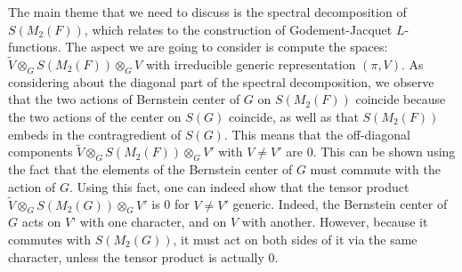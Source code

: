 \documentclass[12pt,a4paper,english]{article}
\theoremstyle{plain}
\theoremstyle{definition}
\begin{document}
The main theme that we need to discuss is the spectral decomposition of $S(M_{2}(F))$, which relates to the construction of Godement-Jacquet $L$-functions. The aspect we are going to consider is compute the spaces: $\tilde{V}\otimes_{G}S(M_{2}(F))\otimes_{G}V$ with irreducible generic representation $(\pi, V)$. As considering about the diagonal part of the spectral decomposition, we observe that the two actions of Bernstein center of $G$ on $S(M_{2}(F))$ coincide because the two actions of the center on $S(G)$ coincide, as well as that $S(M_{2}(F))$ embeds in the contragredient of $S(G)$. This means that the off-diagonal components $\widetilde{V}\otimes_{G}S(M_{2}(F))\otimes_{G}V'$ with $V\not=V'$ are 0. 
This can be shown using the fact that the elements of the Bernstein center of $G$ must commute with the action of $G$. Using this fact, one can indeed show that the tensor product $\widetilde{V} \otimes_G S(M_2(G)) \otimes_G V'$ is 0 for $V\neq V'$ generic. Indeed, the Bernstein center of $G$ acts on $V’$ with one character, and on $V$ with another. However, because it commutes with $S(M_2(G))$, it must act on both sides of it via the same character, unless the tensor product is actually 0.
\end{document}
